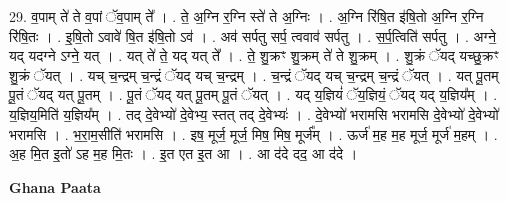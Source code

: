 \documentclass[17pt]{extarticle}
\begin{document}
29. व॒पाम् ते॑ ते व॒पां ॅव॒पाम् ते᳚ । . ते॒ अ॒ग्नि र॒ग्नि स्ते॑ ते अ॒ग्निः । . अ॒ग्नि रि॑षि॒त इ॑षि॒तो अ॒ग्नि र॒ग्नि रि॑षि॒तः । . इ॒षि॒तो ऽवावे॑ षि॒त इ॑षि॒तो ऽव॑ । . अव॑ सर्पतु सर्प॒ त्ववाव॑ सर्पतु । . स॒र्प॒त्विति॑ सर्पतु । . अग्ने॒ यद् यदग्ने ऽग्ने॒ यत् । . यत् ते॑ ते॒ यद् यत् ते᳚ । . ते॒ शु॒क्रꣳ शु॒क्रम् ते॑ ते शु॒क्रम् । . शु॒क्रं ॅयद् यच्छु॒क्रꣳ शु॒क्रं ॅयत् । . यच् च॒न्द्रम् च॒न्द्रं ॅयद् यच् च॒न्द्रम् । . च॒न्द्रं ॅयद् यच् च॒न्द्रम् च॒न्द्रं ॅयत् । . यत् पू॒तम् पू॒तं ॅयद् यत् पू॒तम् । . पू॒तं ॅयद् यत् पू॒तम् पू॒तं ॅयत् । . यद् य॒ज्ञियं॑ ॅय॒ज्ञियं॒ ॅयद् यद् य॒ज्ञिय᳚म् । . य॒ज्ञिय॒मिति॑ य॒ज्ञिय᳚म् । . तद् दे॒वेभ्यो॑ दे॒वेभ्य॒ स्तत् तद् दे॒वेभ्यः॑ । . दे॒वेभ्यो॑ भरामसि भरामसि दे॒वेभ्यो॑ दे॒वेभ्यो॑ भरामसि । . भ॒रा॒म॒सीति॑ भरामसि । . इष॒ मूर्ज॒ मूर्ज॒ मिष॒ मिष॒ मूर्ज᳚म् । . ऊर्ज॑ म॒ह म॒ह मूर्ज॒ मूर्ज॑ म॒हम् । . अ॒ह मि॒त इ॒तो॑ ऽह म॒ह मि॒तः । . इ॒त एत इ॒त आ । . आ द॑दे दद॒ आ द॑दे । \newline

\textbf{Ghana Paata } \newline
\end{document}
